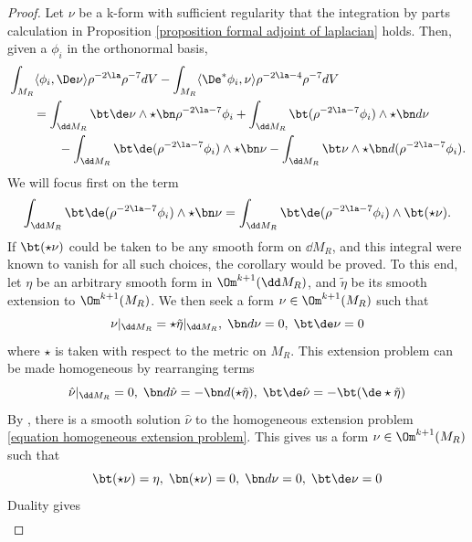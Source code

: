 \documentclass[hidelinks, 12pt, oneside, reqno]{amsart}
\begin{document}
\begin{proof}
    Let $\nu$ be a k-form with sufficient regularity that the integration by parts calculation in Proposition \ref{proposition formal adjoint of laplacian} holds. Then, given a $\phi_i$ in the orthonormal basis, 
    \begin{align}\label{equation integration by parts with bdry}
        & \int_{M_R} \langle \phi_i, \De \nu \rangle \rho^{-2\la} \rho^{-7} dV -  \int_{M_R} \langle \De^* \phi_i, \nu \rangle \rho^{-2\la-4}\rho^{-7} dV \\
        &\qquad = \int_{\dd M_R} \bt \de \nu \wedge \star \bn \rho^{-2\la- 7} \phi_i + \int_{\dd M_R} \bt (\rho^{-2\la- 7} \phi_i) \wedge \star \bn d \nu \nonumber\\
        &\qquad \qquad   -\int_{\dd M_R} \bt \de (\rho^{-2\la- 7} \phi_i) \wedge \star \bn \nu - \int_{\dd M_R} \bt \nu \wedge \star \bn d (\rho^{-2\la- 7} \phi_i). \nonumber
    \end{align}
    We will focus first on the term 
    \[
    \int_{\dd M_R} \bt \de (\rho^{-2\la- 7} \phi_i) \wedge \star \bn \nu = \int_{\dd M_R} \bt \de (\rho^{-2\la- 7} \phi_i) \wedge \bt (\star \nu).
    \]
    If $\bt (\star \nu)$ could be taken to be any smooth form on $\dd M_R$, and this integral were known to vanish for all such choices, the corollary would be proved. To this end, let $\eta$ be an arbitrary smooth form in $\Om^{k+1}(\dd M_R)$, and $\tilde \eta$ be its smooth extension to $\Om^{k+1} (M_R)$. We then seek a form $\nu \in \Om^{k+1} (M_R)$ such that
    \begin{equation}
        \nu|_{\dd M_R} = \star \tilde \eta|_{\dd M_R}, \; \bn d\nu = 0, \; \bt \de \nu = 0
    \end{equation}
    where $\star$ is taken with respect to the metric on $M_R$. This extension problem can be made homogeneous by rearranging terms
    \begin{equation}\label{equation homogeneous extension problem}
        \hat \nu|_{\dd M_R} = 0, \; \bn d\hat \nu = - \bn d (\star \tilde \eta), \; \bt \de \hat \nu = - \bt (\de \star \tilde \eta)
    \end{equation}
    By \cite[Lemma 3.3.2]{HodgeDecompSchwarz}, there is a smooth solution $\hat \nu$ to the homogeneous extension problem \eqref{equation homogeneous extension problem}. This gives us a form $\nu \in \Om^{k+1} (M_R)$ such that
    \[
    \bt (\star \nu) = \eta, \; \bn (\star \nu) = 0, \; \bn d\nu = 0, \; \bt \de \nu = 0
    \]
    Duality gives 
    \begin{align*}

\end{align*}
\end{proof}
\end{document}
